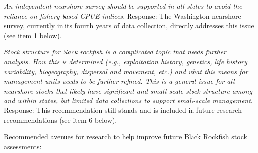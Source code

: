 \documentclass[11pt,
  letterpaper,
]{article}
\begin{document}
\textit{An independent nearshore survey should be supported in all states to avoid the reliance on fishery-based CPUE indices.} Response: The Washington nearshore survey, currently in its fourth years of data collection, directly addresses this issue (see item 1 below).

\textit{Stock structure for black rockfish is a complicated topic that needs further analysis. How this is determined (e.g., exploitation history, genetics, life history variability, biogeography, dispersal and movement, etc.) and what this means for management units needs to be further refined. This is a general issue for all nearshore stocks that likely have significant and small scale stock structure among and within states, but limited data collections to support small-scale management.} Response: This recommendation still stands and is included in future research recommendations (see item 6 below).

Recommended avenues for research to help improve future Black Rockfish stock assessments:
\end{document}

